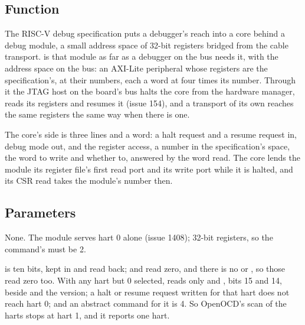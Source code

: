 
%
{}

\subsection*{Function}

The RISC-V debug specification puts a debugger's reach into a core
behind a debug module, a small address space of 32-bit registers
bridged from the cable transport.  is that module as far as
a debugger on the bus needs it, with the address space on the bus:
an AXI-Lite peripheral whose registers are the specification's, at
their numbers, each a word at four times its number. Through it the
JTAG host on the board's bus halts the core from the hardware manager,
reads its registers and resumes it (issue 154), and a transport of its
own reaches the same registers the same way when there is one.

The core's side is three lines and a word: a halt request and a
resume request in, debug mode out, and the register access, a number
in the specification's space, the word to write and whether to,
answered by the word read. The core lends the module its register
file's first read port and its write port while it is halted, and its
CSR read takes the module's number then.

\subsection*{Parameters}

None. The module serves hart 0 alone (issue 1408); 32-bit registers,
so the command's  must be 2.

 is ten bits, kept in  and read back;
 and  read zero, and there is no
 or , so those read zero too. With
any hart but 0 selected,  reads only
 and , bits 15 and 14,
beside  and the version; a halt or resume request
written for that hart does not reach hart 0; and an abstract command
for it is  4. So OpenOCD's scan of the harts stops at hart
1, and it reports one hart.

